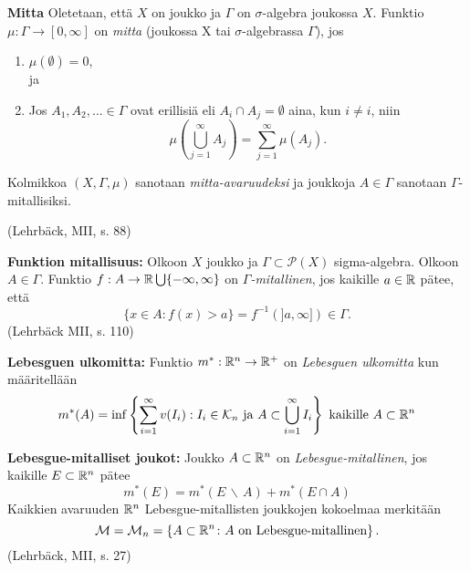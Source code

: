 \begin{definition}
    \textbf{Mitta} Oletetaan, että $X$ on joukko ja $\Gamma$ on $\sigma$-algebra joukossa $X$. Funktio $\mu : \Gamma \to [0, \infty]$ on \textit{mitta} (joukossa X tai $\sigma$-algebrassa $\Gamma$), jos 
    \begin{enumerate}
        \item $\mu(\emptyset) = 0$, \\
        ja
        \item Jos $A_1, A_2, ... \in \Gamma$ ovat erillisiä eli $A_i \cap A_j = \emptyset$ aina, kun $i \ne i$, niin
        $$\mu\left(\bigcup_{j=1}^\infty A_j \right) = \sum_{j=1}^\infty \mu(A_j).$$
    \end{enumerate}
    
    Kolmikkoa $(X,\Gamma, \mu)$ sanotaan \textit{mitta-avaruudeksi} ja joukkoja $A\in \Gamma$ sanotaan $\Gamma$-mitallisiksi.
    
    (Lehrbäck, MII, s. 88)
\end{definition}

\begin{definition}
    \textbf{Funktion mitallisuus:} Olkoon $X$ joukko ja $\Gamma \subset \mathcal P (X)$ sigma-algebra. Olkoon $A\in \Gamma$. Funktio $f: A \to \mathbb{R} \bigcup\{-\infty, \infty\}$ on \textit{$\Gamma$-mitallinen}, jos kaikille $a \in \mathbb{R}$ pätee, että
    \begin{equation*}
        \{x \in A : f(x) > a\} = f^{-1}(]a, \infty]) \in \Gamma.
    \end{equation*} (Lehrbäck MII, s. 110)
\end{definition}

\begin{definition}
    \textbf{Lebesguen ulkomitta:} Funktio $m^* : \mathbb{R}^n \to \mathbb{R}^+$ on \textit{Lebesguen ulkomitta} kun määritellään
    $$m^*(A) = \inf\left\{\sum_{i=1}^\infty v(I_i) : I_i \in \mathcal K_n \text{ ja } A \subset \bigcup_{i=1}^{\infty}I_i\right\} \text{ kaikille } A \subset \mathbb{R}^n$$
\end{definition}

\begin{definition}
    \textbf{Lebesgue-mitalliset joukot:} Joukko $A\subset \mathbb{R}^n$ on \textit{Lebesgue-mitallinen}, jos kaikille $E\subset \mathbb{R}^n$ pätee
    $$m^*(E) = m^*(E \, \backslash \, A) + m^*(E\cap A)$$
    Kaikkien avaruuden $\mathbb{R}^n$ Lebesgue-mitallisten joukkojen kokoelmaa merkitään 
    $$\mathcal M = \mathcal M_n = \left\{A\subset \mathbb{R}^n \colon A \text{ on Lebesgue-mitallinen} \right\}.$$
    (Lehrbäck, MII, s. 27)
\end{definition}


